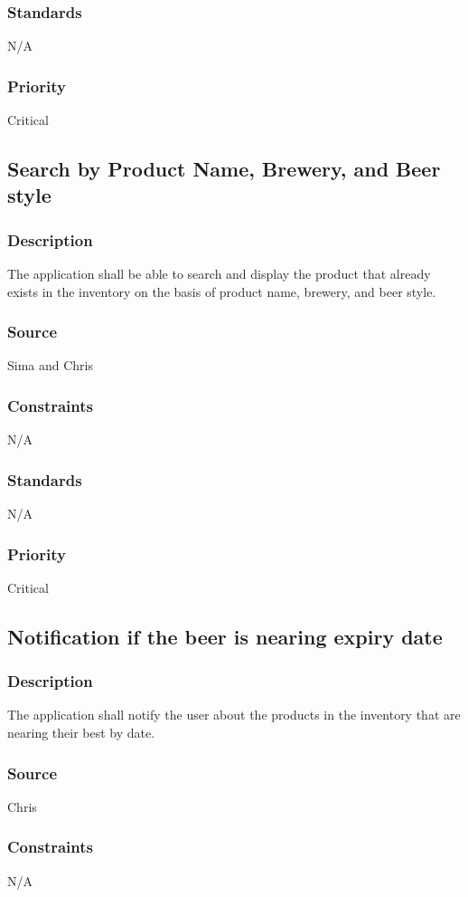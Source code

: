 \subsubsection{Standards}
N/A
\subsubsection{Priority}
Critical

\subsection{Search by Product Name, Brewery, and Beer style}
\subsubsection{Description}
The application shall be able to search and display the product that already exists in the inventory on the basis of product name, brewery, and beer style.
\subsubsection{Source}
Sima and Chris
\subsubsection{Constraints}
N/A
\subsubsection{Standards}
N/A
\subsubsection{Priority}
Critical

\subsection{Notification if the beer is nearing expiry date}
\subsubsection{Description}
The application shall notify the user about the products in the inventory that are nearing their best by date.
\subsubsection{Source}
Chris
\subsubsection{Constraints}
N/A
